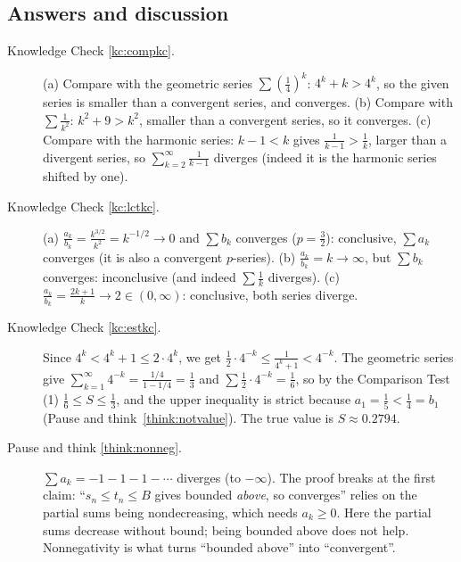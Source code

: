 \documentclass[11pt]{article}
\begin{document}
\subsection*{Answers and discussion}

\begin{description}
  \item[Knowledge Check \ref{kc:compkc}.] (a) Compare with the geometric series $\sum\left(\frac14\right)^k$: $4^k+k>4^k$, so the given series is smaller than a convergent series, and converges. (b) Compare with $\sum\frac1{k^2}$: $k^2+9>k^2$, smaller than a convergent series, so it converges. (c) Compare with the harmonic series: $k-1<k$ gives $\frac1{k-1}>\frac1k$, larger than a divergent series, so $\sum_{k=2}^\infty\frac1{k-1}$ diverges (indeed it is the harmonic series shifted by one).
  \item[Knowledge Check \ref{kc:lctkc}.] (a) $\frac{a_k}{b_k}=\frac{k^{3/2}}{k^2}=k^{-1/2}\to0$ and $\sum b_k$ converges ($p=\frac32$): conclusive, $\sum a_k$ converges (it is also a convergent $p$-series). (b) $\frac{a_k}{b_k}=k\to\infty$, but $\sum b_k$ converges: inconclusive (and indeed $\sum\frac1k$ diverges). (c) $\frac{a_k}{b_k}=\frac{2k+1}k\to2\in(0,\infty)$: conclusive, both series diverge.
  \item[Knowledge Check \ref{kc:estkc}.] Since $4^k<4^k+1\le2\cdot4^k$, we get $\frac12\cdot4^{-k}\le\frac1{4^k+1}<4^{-k}$. The geometric series give $\sum_{k=1}^\infty4^{-k}=\frac{1/4}{1-1/4}=\frac13$ and $\sum\frac12\cdot4^{-k}=\frac16$, so by the Comparison Test (1) $\frac16\le S\le\frac13$, and the upper inequality is strict because $a_1=\frac15<\frac14=b_1$ (Pause and think~\ref{think:notvalue}). The true value is $S\approx0.2794$.
  \item[Pause and think \ref{think:nonneg}.] $\sum a_k=-1-1-1-\cdots$ diverges (to $-\infty$). The proof breaks at the first claim: ``$s_n\le t_n\le B$ gives bounded \emph{above}, so converges'' relies on the partial sums being nondecreasing, which needs $a_k\ge0$. Here the partial sums decrease without bound; being bounded above does not help. Nonnegativity is what turns ``bounded above'' into ``convergent''.

\end{description}
\end{document}

